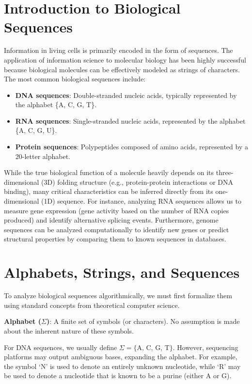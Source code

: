 \documentclass[11pt,a4paper]{article}
\begin{document}
\section{Introduction to Biological Sequences}

Information in living cells is primarily encoded in the form of sequences. The application of information science to molecular biology has been highly successful because biological molecules can be effectively modeled as strings of characters. The most common biological sequences include:
\begin{itemize}
    \item \textbf{DNA sequences}: Double-stranded nucleic acids, typically represented by the alphabet \{A, C, G, T\}.
    \item \textbf{RNA sequences}: Single-stranded nucleic acids, represented by the alphabet \{A, C, G, U\}.
    \item \textbf{Protein sequences}: Polypeptides composed of amino acids, represented by a 20-letter alphabet.
\end{itemize}

While the true biological function of a molecule heavily depends on its three-dimensional (3D) folding structure (e.g., protein-protein interactions or DNA binding), many critical characteristics can be inferred directly from its one-dimensional (1D) sequence. For instance, analyzing RNA sequences allows us to measure gene expression (gene activity based on the number of RNA copies produced) and identify alternative splicing events. Furthermore, genome sequences can be analyzed computationally to identify new genes or predict structural properties by comparing them to known sequences in databases.

\section{Alphabets, Strings, and Sequences}

To analyze biological sequences algorithmically, we must first formalize them using standard concepts from theoretical computer science.

\begin{important}
\textbf{Alphabet (\(\Sigma\))}: A finite set of symbols (or characters). No assumption is made about the inherent nature of these symbols.
\end{important}

For DNA sequences, we usually define \(\Sigma = \{\text{A, C, G, T}\}\). However, sequencing platforms may output ambiguous bases, expanding the alphabet. For example, the symbol `N' is used to denote an entirely unknown nucleotide, while `R' may be used to denote a nucleotide that is known to be a purine (either A or G). 
\end{document}
